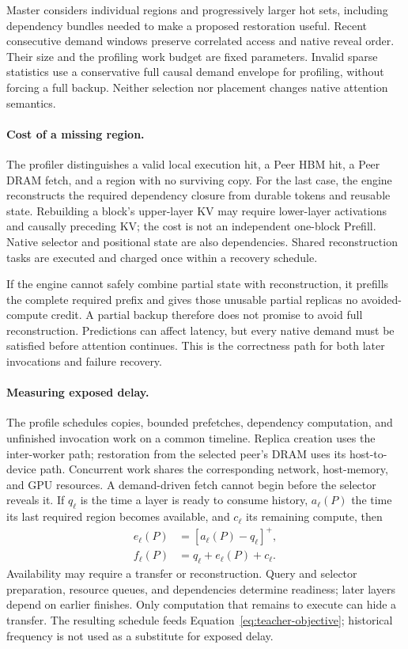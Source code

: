 Master considers individual regions and progressively larger hot sets,
including dependency bundles needed to make a proposed restoration
useful. Recent consecutive demand windows preserve correlated access
and native reveal order. Their size and the profiling work budget are
fixed parameters. Invalid sparse statistics use a conservative full
causal demand envelope for profiling, without forcing a full backup.
Neither selection nor placement changes native attention semantics.

\paragraph{Cost of a missing region.}
The profiler distinguishes a valid local execution hit, a Peer HBM hit, a
Peer DRAM fetch, and a region with no surviving copy. For the last case,
the engine reconstructs the required dependency closure from durable
tokens and reusable state. Rebuilding a block's upper-layer KV may
require lower-layer activations and causally preceding KV; the cost is
not an independent one-block Prefill. Native selector and positional
state are also dependencies. Shared reconstruction tasks are executed
and charged once within a recovery schedule.

If the engine cannot safely combine partial state with reconstruction,
it prefills the complete required prefix and gives those unusable
partial replicas no avoided-compute credit. A partial backup therefore
does not promise to avoid full reconstruction. Predictions can affect
latency, but every native demand must be satisfied before attention
continues. This is the correctness path for both later invocations
and failure recovery.

\paragraph{Measuring exposed delay.}
The profile schedules copies, bounded prefetches, dependency computation,
and unfinished invocation work on a common timeline. Replica creation
uses the inter-worker path; restoration from the selected peer's DRAM
uses its host-to-device path. Concurrent work shares the corresponding
network, host-memory, and GPU resources. A demand-driven
fetch cannot begin before the selector reveals it. If $q_\ell$ is the
time a layer is ready to consume history, $a_\ell(P)$ the time its last
required region becomes available, and $c_\ell$ its remaining compute,
then
\begin{equation}
 \begin{aligned}
 e_\ell(P)&=[a_\ell(P)-q_\ell]^+,\\
 f_\ell(P)&=q_\ell+e_\ell(P)+c_\ell.
 \end{aligned}
 \label{eq:teacher-overlap}
\end{equation}
Availability may require a transfer or reconstruction. Query and
selector preparation, resource queues, and dependencies determine
readiness; later layers depend on earlier finishes. Only computation
that remains to execute can hide a transfer. The resulting schedule
feeds Equation~\ref{eq:teacher-objective}; historical frequency is not
used as a substitute for exposed delay.


